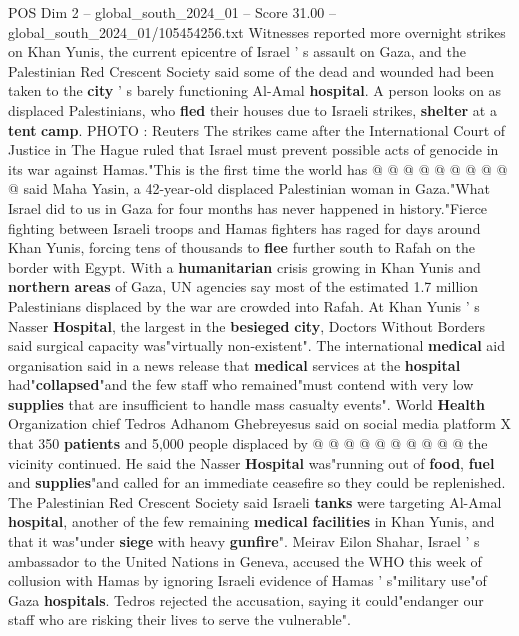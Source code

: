 \begin{textsample}{POS Dim 2 – global\_south\_2024\_01 – Score 31.00 – global\_south\_2024\_01/105454256.txt}
Witnesses reported more overnight strikes on Khan Yunis, the current epicentre of Israel ' s assault on Gaza, and the Palestinian Red Crescent Society said some of the dead and wounded had been taken to the \textbf{city} ' s barely functioning Al-Amal \textbf{hospital}.
A person looks on as displaced Palestinians, who \textbf{fled} their houses due to Israeli strikes, \textbf{shelter} at a \textbf{tent} \textbf{camp}.
PHOTO : Reuters The strikes came after the International Court of Justice in The Hague ruled that Israel must prevent possible acts of genocide in its war against Hamas."This is the first time the world has @ @ @ @ @ @ @ @ @ @ said Maha Yasin, a 42-year-old displaced Palestinian woman in Gaza."What Israel did to us in Gaza for four months has never happened in history."Fierce fighting between Israeli troops and Hamas fighters has raged for days around Khan Yunis, forcing tens of thousands to \textbf{flee} further south to Rafah on the border with Egypt.
With a \textbf{humanitarian} crisis growing in Khan Yunis and \textbf{northern} \textbf{areas} of Gaza, UN agencies say most of the estimated 1.7 million Palestinians displaced by the war are crowded into Rafah.
At Khan Yunis ' s Nasser \textbf{Hospital}, the largest in the \textbf{besieged} \textbf{city}, Doctors Without Borders said surgical capacity was"virtually non-existent".
The international \textbf{medical} aid organisation said in a news release that \textbf{medical} services at the \textbf{hospital} had"\textbf{collapsed}"and the few staff who remained"must contend with very low \textbf{supplies} that are insufficient to handle mass casualty events".
World \textbf{Health} Organization chief Tedros Adhanom Ghebreyesus said on social media platform X that 350 \textbf{patients} and 5,000 people displaced by @ @ @ @ @ @ @ @ @ @ the vicinity continued.
He said the Nasser \textbf{Hospital} was"running out of \textbf{food}, \textbf{fuel} and \textbf{supplies}"and called for an immediate ceasefire so they could be replenished.
The Palestinian Red Crescent Society said Israeli \textbf{tanks} were targeting Al-Amal \textbf{hospital}, another of the few remaining \textbf{medical} \textbf{facilities} in Khan Yunis, and that it was"under \textbf{siege} with heavy \textbf{gunfire}".
Meirav Eilon Shahar, Israel ' s ambassador to the United Nations in Geneva, accused the WHO this week of collusion with Hamas by ignoring Israeli evidence of Hamas ' s"military use"of Gaza \textbf{hospitals}.
Tedros rejected the accusation, saying it could"endanger our staff who are risking their lives to serve the vulnerable".

\end{textsample}

